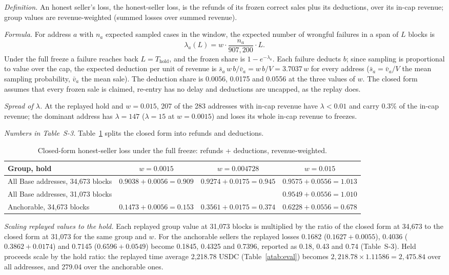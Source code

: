 \documentclass[10pt,a4paper]{article}
\newcommand{\Thold}{T_{\mathrm{hold}}}
\theoremstyle{plain}
\theoremstyle{remark}
\begin{document}
\emph{Definition.} An honest seller's loss, the honest-seller loss, is the refunds of its frozen correct sales plus its deductions, over its in-cap revenue; group values are revenue-weighted (summed losses over summed revenue).

\emph{Formula.} For address $a$ with $n_a$ expected sampled cases in the window, the expected number of wrongful failures in a span of $L$ blocks is
\[
\lambda_a(L)=w\cdot\frac{n_a}{907{,}200}\cdot L .
\]
Under the full freeze a failure reaches back $L=\Thold$, and the frozen share is $1-e^{-\lambda_a}$. Each failure deducts $b$; since sampling is proportional to value over the cap, the expected deduction per unit of revenue is $\bar s_a\,w\,b/\bar v_a=w\,b/V=3.7037\,w$ for every address ($\bar s_a=\bar v_a/V$ the mean sampling probability, $\bar v_a$ the mean sale). The deduction share is 0.0056, 0.0175 and 0.0556 at the three values of $w$. The closed form assumes that every frozen sale is claimed, re-entry has no delay and deductions are uncapped, as the replay does.

\emph{Spread of $\lambda$.} At the replayed hold and $w=0.015$, 207 of the 283 addresses with in-cap revenue have $\lambda<0.01$ and carry 0.3\% of the in-cap revenue; the dominant address has $\lambda=147$ ($\lambda=15$ at $w=0.0015$) and loses its whole in-cap revenue to freezes.

\emph{Numbers in Table~S-3.} Table~\ref{tab:cf} splits the closed form into refunds and deductions.

\begin{table}[!htbp]
\centering
\caption{Closed-form honest-seller loss under the full freeze: refunds + deductions, revenue-weighted.}
\label{tab:cf}
\small
\begin{tabular}{@{}lccc@{}}
\toprule
Group, hold & $w=0.0015$ & $w=0.004728$ & $w=0.015$ \\
\midrule
All Base addresses, 34,673 blocks & $0.9038+0.0056=0.909$ & $0.9274+0.0175=0.945$ & $0.9575+0.0556=1.013$ \\
All Base addresses, 31,073 blocks & & & $0.9549+0.0556=1.010$ \\
Anchorable, 34,673 blocks & $0.1473+0.0056=0.153$ & $0.3561+0.0175=0.374$ & $0.6228+0.0556=0.678$ \\
\bottomrule
\end{tabular}
\end{table}

\emph{Scaling replayed values to the hold.} Each replayed group value at 31,073 blocks is multiplied by the ratio of the closed form at 34,673 to the closed form at 31,073 for the same group and $w$. For the anchorable sellers the replayed losses 0.1682 ($0.1627+0.0055$), 0.4036 ($0.3862+0.0174$) and 0.7145 ($0.6596+0.0549$) become 0.1845, 0.4325 and 0.7396, reported as 0.18, 0.43 and 0.74 (Table~S-3). Held proceeds scale by the hold ratio: the replayed time average 2,218.78 USDC (Table~\ref{atab:eval}) becomes $2{,}218.78\times1.11586=2{,}475.84$ over all addresses, and 279.04 over the anchorable ones.
\end{document}

